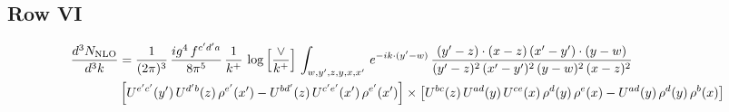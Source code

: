 \documentclass[9pt]{article}
\numberwithin{equation}{section}
\begin{document}
\subsection{Row VI}
\begin{align}
\frac{d^{3}N_{\rm NLO}}{d^{3}k} & = \frac{1}{(2\pi)^{3}}\, \frac{ig^{4}\,f^{c'd'a}}{8\pi^{5}}\, \frac{1}{k^{+}}\,\log{\left[\frac{\vee}{k^{+}}\right]}\,\int_{w,y',z,y,x,x'}\, e^{-ik\cdot (y'-w)}\,\frac{(y'-z)\cdot (x-z)\,(x'-y')\cdot (y-w)}{(y'-z)^{2}\,(x'-y')^{2}\,(y-w)^{2}\,(x-z)^{2}}\notag \\
& \left[U^{e'c'}(y')\,U^{d'b}(z)\,\rho^{e'}(x')-U^{bd'}(z)\,U^{c'e'}(x')\,\rho^{e'}(x')\right]\times \left[U^{bc}(z)\,U^{ad}(y)\,U^{ce}(x)\,\rho^{d}(y)\,\rho^{e}(x)-U^{ad}(y)\,\rho^{d}(y)\,\rho^{b}(x)\right]
\end{align}
\end{document}
